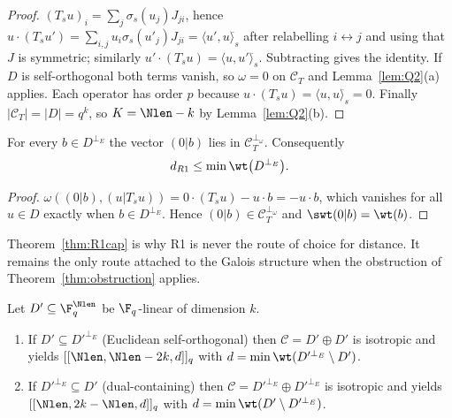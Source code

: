 \begin{proof}
$(T_su)_i=\sum_j\sigma_s(u_j)J_{ji}$, hence
$u\cdot(T_su')=\sum_{i,j}u_i\sigma_s(u'_j)J_{ji}
=\langle u',u\rangle^{\widehat{}}_s$ after relabelling $i\leftrightarrow j$ and
using that $J$ is symmetric; similarly
$u'\cdot(T_su)=\langle u,u'\rangle^{\widehat{}}_s$. Subtracting gives the
identity. If $D$ is self-orthogonal both terms vanish, so $\omega=0$ on
$\mathcal C_T$ and Lemma~\ref{lem:Q2}(a) applies. Each operator has order $p$
because $u\cdot(T_su)=\langle u,u\rangle^{\widehat{}}_s=0$. Finally
$|\mathcal C_T|=|D|=q^k$, so $K=\Nlen-k$ by Lemma~\ref{lem:Q2}(b).
\end{proof}

\begin{theorem}\label{thm:R1cap}
For every $b\in D^{\perp_E}$ the vector $(0|b)$ lies in
$\mathcal C_T^{\perp_\omega}$. Consequently
\[
  d_{R1}\le\min\wt\bigl(D^{\perp_E}\bigr).
\]
\end{theorem}

\begin{proof}
$\omega((0|b),(u|T_su))=0\cdot(T_su)-u\cdot b=-u\cdot b$, which vanishes for
all $u\in D$ exactly when $b\in D^{\perp_E}$. Hence
$(0|b)\in\mathcal C_T^{\perp_\omega}$ and $\swt(0|b)=\wt(b)$.
\end{proof}

Theorem~\ref{thm:R1cap} is why R1 is never the route of choice for distance. It
remains the only route attached to the Galois structure when the obstruction of
Theorem~\ref{thm:obstruction} applies.

\begin{theorem}\label{thm:R2}
Let $D'\subseteq\F_q^{\Nlen}$ be $\F_q$-linear of dimension $k$.
\begin{enumerate}[label=\textnormal{(\alph*)},leftmargin=*]
\item If $D'\subseteq D'^{\perp_E}$ (Euclidean self-orthogonal) then
  $\mathcal C=D'\oplus D'$ is isotropic and yields
  $[[\Nlen,\Nlen-2k,d]]_q$ with $d=\min\wt(D'^{\perp_E}\setminus D')$.
\item If $D'^{\perp_E}\subseteq D'$ (dual-containing) then
  $\mathcal C=D'^{\perp_E}\oplus D'^{\perp_E}$ is isotropic and yields
  $[[\Nlen,2k-\Nlen,d]]_q$ with $d=\min\wt(D'\setminus D'^{\perp_E})$.
\end{enumerate}
\end{theorem}


